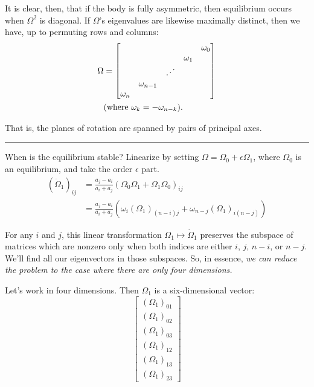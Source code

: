 \documentclass{article}
\begin{document}
It is clear, then, that if the body is fully asymmetric, then equilibrium occurs when \(\Omega^2\) is diagonal.
If \(\Omega\)'s eigenvalues are likewise maximally distinct, then we have, up to permuting rows and columns:
\begin{align*}
    \Omega &= \begin{bmatrix}
        &&&&\omega_0 \\ &&&\omega_1 \\ &&\reflectbox{$\ddots$} \\ &\omega_{n-1} \\ \omega_n
    \end{bmatrix}
    \\ &\text{(where \(\omega_k = -\omega_{n-k}\)).}
\end{align*}

That is, the planes of rotation are spanned by pairs of principal axes.

\vspace*{1em}\hrule\vspace*{1em}

When is the equilibrium stable? Linearize by setting \(\Omega = \Omega_0 + \epsilon\Omega_1\), where \(\Omega_0\) is an equilibrium, and take the order \(\epsilon\) part.
\begin{align*}
    (\dot{\Omega}_1)_{ij} &= \frac{a_j - a_i}{a_i + a_j} (\Omega_0\Omega_1 + \Omega_1\Omega_0)_{ij}
    \\ &= \frac{a_j - a_i}{a_i + a_j} (\omega_i (\Omega_1)_{(n-i)j} + \omega_{n-j}(\Omega_1)_{i(n-j)})
\end{align*}

For any \(i\) and \(j\), this linear transformation \(\Omega_1 \mapsto \dot\Omega_1\) preserves the subspace of matrices which are nonzero only when both indices are either \(i\), \(j\), \(n-i\), or \(n-j\).
We'll find all our eigenvectors in those subspaces. So, in essence, \emph{we can reduce the problem to the case where there are only four dimensions.}

\pagebreak

Let's work in four dimensions. Then \(\Omega_1\) is a six-dimensional vector:
\[\begin{bmatrix}
    (\Omega_1)_{01} \\ (\Omega_1)_{02} \\ (\Omega_1)_{03} \\ (\Omega_1)_{12} \\ (\Omega_1)_{13} \\ (\Omega_1)_{23}
\end{bmatrix}\]
\end{document}
